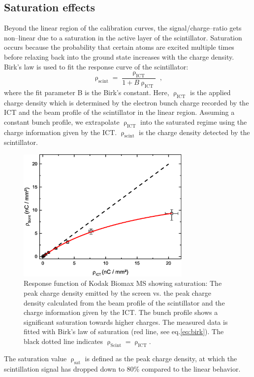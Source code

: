\documentclass[%
reprint,
amsmath,
amssymb,
aip,
rsi, 
numerical,
floatfix,
]{revtex4-1}
\begin{document}
\subsection{\label{Se}Saturation effects}
Beyond the linear region of the calibration curves, the signal/charge--ratio gets non--linear due to a saturation in the active layer of the scintillator.
Saturation occurs because the probability that certain atoms are excited multiple times before relaxing back into the ground state increases with the charge density.
Birk’s law is used to fit the response curve of the scintillator:
\begin{equation}
\uprho_{\text{scint}} = \frac{\uprho_{\text{ICT}}}{1+B\uprho_{\text{ICT}}}{\;,}
\label{eq:birk}
\end{equation}
where the fit parameter B is the Birk's constant.
Here, $\uprho_{\text{ICT}}$ is the applied charge density which is determined by the electron bunch charge recorded by the ICT and the beam profile of the scintillator in the linear region. 
Assuming a constant bunch profile, we extrapolate $\uprho_{\text{ICT}}$ into the saturated regime using the charge information given by the ICT. 
$\uprho_{\text{scint}}$ is the charge density detected by the scintillator.
\begin{figure}
\includegraphics[width=8.5cm]{./Figures/Sat_V2}%
\caption{\label{fig:Sat} Response function of Kodak Biomax MS showing saturation: The peak charge density emitted by the screen vs. the peak charge density calculated from the beam profile of the scintillator and the charge information given by the ICT. 
The bunch profile shows a significant saturation towards higher charges. 
The measured data is fitted with Birk's law of saturation (red line, see eq.\ref{eq:birk}). 
The black dotted line indicates $\uprho_{\text{Scint}} = \uprho_{\text{ICT}}$.}
\end{figure}
The saturation value $\uprho_{\text{sat}}$ is defined as the peak charge density, at which the scintillation signal has dropped down to 80$\%$ compared to the linear behavior.
\end{document}
